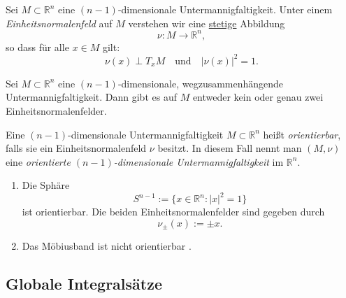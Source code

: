 \documentclass[11pt, a4paper]{article}
\begin{document}
\begin{definition}
 Sei $M \subset \mathbb{R}^n$ eine $(n-1)$-dimensionale Untermannigfaltigkeit. Unter einem \emph{Einheitsnormalenfeld} auf $M$ verstehen wir eine \underline{stetige} Abbildung
\[
\nu : M \to \mathbb{R}^n,
\]
so dass für alle $x \in M$ gilt:
\[
\nu(x) \perp T_x M
\quad \text{und} \quad
|\nu(x)|^2 = 1.
\]
\end{definition}

\begin{lemma} Sei $M \subset \mathbb{R}^n$ eine $(n-1)$-dimensionale, wegzusammenhängende 
Untermannigfaltigkeit. Dann gibt es auf $M$ entweder kein 
oder genau zwei Einheitsnormalenfelder.
\end{lemma}

\begin{definition}
 Eine $(n-1)$-dimensionale Untermannigfaltigkeit $M \subset \mathbb{R}^n$ heißt \emph{orientierbar}, 
falls sie ein Einheitsnormalenfeld $\nu$ besitzt. In diesem Fall nennt man $(M,\nu)$ eine 
\emph{orientierte $(n-1)$-dimensionale Untermannigfaltigkeit} 
im $\mathbb{R}^n$.
\end{definition}

\begin{example}

\begin{enumerate}
    \item[(a)] Die Sphäre
    \[
    S^{n-1} := \{ x \in \mathbb{R}^n : |x|^2 = 1 \}
    \]
    ist orientierbar. Die beiden Einheitsnormalenfelder sind gegeben durch
    \[
    \nu_\pm(x) := \pm x.
    \]

    \item[(b)] Das Möbiusband ist nicht orientierbar .
\end{enumerate}
\end{example}


\vspace{0.3cm} \par \subsection{Globale Integralsätze}
\end{document}
